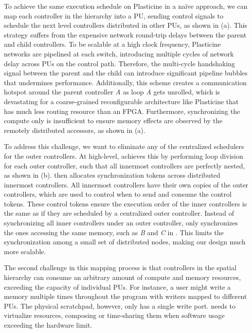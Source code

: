 To achieve the same execution schedule on Plasticine in a na\"ive approach, 
we can map each controller in the hierarchy into a PU, sending control signals to schedule the next level controllers distributed in other PUs, as shown in  (a).
This strategy suffers from the expensive network round-trip delays between the parent and child controllers.
To be scalable at a high clock frequency, Plasticine networks are pipelined at each switch,
introducing multiple cycles of network delay across PUs on the control path.
Therefore, the multi-cycle handshaking signal between the parent and the child can introduce significant pipeline bubbles
that undermines performance.
Additionally, this scheme creates a communication hotspot around the parent controller \emph{A} as
loop \emph{A} gets unrolled, which is devastating for a coarse-grained reconfigurable architecture
like Plasticine that has much less routing resource than an FPGA.
Furthermore, synchronizing the compute only is insufficient to ensure memory effects are observed by
the remotely distributed accessors, as shown in  (a).

To address this challenge, we want to eliminate any of the centralized schedulers for the outer
controllers.
At high-level, \name achieves this by performing loop division for each outer controller, such that
all innermost controllers are perfectly nested, as shown in  (b).
\name then allocates synchronization tokens across distributed innermost controllers.
All innermost controllers have their own copies of the outer controllers, which are used
to control when to send and consume the control tokens.
These control tokens ensure the execution order of the inner controllers is the same as if they are
scheduled by a centralized outer controller. Instead of synchronizing all inner controllers under an outer controller, \name only synchronizes the ones accessing the same memory, such as \emph{B} and
\emph{C} in . This limits the synchronization among a small set of distributed nodes, 
making our design much more scalable.

The second challenge in this mapping process is that controllers in the spatial hierarchy
can consume an arbitrary amount of compute and memory resources, exceeding the capacity of individual
PUs. For instance, a user might write a memory multiple times throughout the program with writers mapped to different PUs. The physical scratchpad, however, only has a single write
port. \name needs to virtualize resources, composing or time-sharing them when software usage
exceeding the hardware limit.

